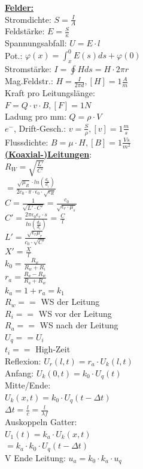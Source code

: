 \documentclass[11pt]{article}
\begin{document}
\begin{minipage}{0.33\textwidth}

\underline{\textbf{Felder:}}\\
Stromdichte: $S=\frac{I}{A}$\\
Feldstärke: $E=\frac{S}{\kappa}$\\
Spannungsabfall: $U=E \cdot l$\\
Pot.: $\varphi (x)= \int_x^0 E(s)ds + \varphi(0)$\\
Stromstärke: $I = \oint H ds = H \cdot 2\pi r$\\
Mag.Feldstr.: $H = \frac{I}{2\pi d}, [H] = 1\frac{A}{m}$\\
Kraft pro Leitungslänge:\\
\phantom{ss} $F=Q \cdot v \cdot B, [F] = 1N$\\
Ladung pro mm: $Q = \rho \cdot V$\\
$e^-$, Drift-Gesch.: $v = \frac{S}{\rho}, [v] = 1\frac{m}{s}$\\
Flussdichte: $B=\mu \cdot H, [B] = 1 \frac{Vs}{m^2}$\\
 
 \underline{\textbf{(Koaxial-)Leitungen}}:\\
$R_W = \sqrt{\frac{L'}{C'}}$\\
    \phantom{sssi} $=\frac{\sqrt{\mu_R} \cdot ln(\frac{d_a}{d_i})}{2c_0 \cdot \pi \cdot \epsilon_0 \cdot \sqrt{\epsilon_R}}$\\
$C = \frac{1}{\sqrt{L' \cdot C'}} = \frac{c_0}{\sqrt{\epsilon_r \cdot \mu_s}}$\\
$C' = \frac{2\pi \epsilon_0 \epsilon_r \cdot s}{ln(\frac{d_a}{d_i})}$ = $\frac{C}{l}$\\
$L' = \frac{\sqrt{\epsilon_r \mu_r}}{c_0 \cdot \sqrt{C'}}$\\
$X' = \frac{X}{l}$\\

$k_0 = \frac{R_w}{R_w + R_i} $\\
$r_a = \frac{R_a - R_w}{R_a + R_w} $\\
$k_a = 1 + r_a = k_1$\\
$R_w ==$ WS der Leitung\\
$R_i ==$ WS vor der Leitung\\
$R_a ==$ WS nach der Leitung\\
$U_q == U_i$\\
$t_i ==$ High-Zeit\\
Reflexion: $U_r(l,t) = r_a \cdot U_k(l,t)$\\
Anfang: $U_k(0,t)=k_0 \cdot U_{q}(t)$\\
Mitte/Ende:\\
\phantom{ss} $U_k(x,t)= k_0 \cdot U_{q}(t-\Delta t)$\\
\phantom{sss}$\Delta t = \frac{l}{c} = \frac{l}{\lambda f}$\\
Auskoppeln Gatter:\\
\phantom{ss} $U_1(t) = k_a \cdot U_k(x,t) $\\
\phantom{sssssssiiii}$= k_a\cdot k_0 \cdot U_q(t-\Delta t)$\\
V Ende Leitung: $u_a = k_0 \cdot k_a \cdot u_q$\\


\end{minipage}
\end{document}
